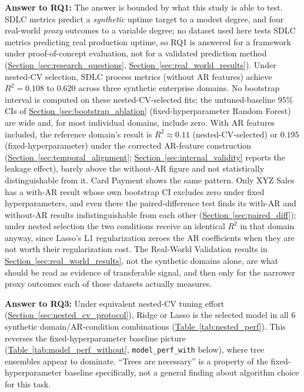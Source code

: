 \documentclass[technologies,article,submit,pdftex,moreauthors]{Definitions/mdpi}
\begin{document}
\textbf{Answer to RQ1:} The answer is bounded by what this study is able to test. SDLC metrics predict a \emph{synthetic} uptime target to a modest degree, and four real-world \emph{proxy} outcomes to a variable degree; no dataset used here tests SDLC metrics predicting real production uptime, so RQ1 is answered for a framework under proof-of-concept evaluation, not for a validated prediction method (\hyperref[sec:research_questions]{Section~\ref*{sec:research_questions}}, \hyperref[sec:real_world_results]{Section~\ref*{sec:real_world_results}}). Under nested-CV selection, SDLC process metrics (without AR features) achieve \(R^2 = 0.108\) to \(0.620\) across three synthetic enterprise domains. No bootstrap interval is computed on these nested-CV-selected fits; the untuned-baseline 95\% CIs of \hyperref[sec:bootstrap_ablation]{Section~\ref*{sec:bootstrap_ablation}} (fixed-hyperparameter Random Forest) are wide and, for most individual domains, include zero. With AR features included, the reference domain's result is \(R^2\approx0.11\) (nested-CV-selected) or \(0.195\) (fixed-hyperparameter) under the corrected AR-feature construction (\hyperref[sec:temporal_alignment]{Section~\ref*{sec:temporal_alignment}}; \hyperref[sec:internal_validity]{Section~\ref*{sec:internal_validity}} reports the leakage effect), barely above the without-AR figure and not statistically distinguishable from it. Card Payment shows the same pattern. Only XYZ Sales has a with-AR result whose own bootstrap CI excludes zero under fixed hyperparameters, and even there the paired-difference test finds its with-AR and without-AR results indistinguishable from each other (\hyperref[sec:paired_diff]{Section~\ref*{sec:paired_diff}}); under nested selection the two conditions receive an identical \(R^2\) in that domain anyway, since Lasso's L1 regularization zeroes the AR coefficients when they are not worth their regularization cost. The Real-World Validation results in \hyperref[sec:real_world_results]{Section~\ref*{sec:real_world_results}}, not the synthetic domains alone, are what should be read as evidence of transferable signal, and then only for the narrower proxy outcomes each of those datasets actually measures.

\textbf{Answer to RQ3:} Under equivalent nested-CV tuning effort (\hyperref[sec:nested_cv_protocol]{Section~\ref*{sec:nested_cv_protocol}}), Ridge or Lasso is the selected model in all 6 synthetic domain/AR-condition combinations (\hyperref[tab:nested_perf]{Table~\ref*{tab:nested_perf}}). This reverses the fixed-hyperparameter baseline picture (\hyperref[tab:model_perf_without]{Table~\ref*{tab:model_perf_without}}, \texttt{model\_perf\_with} below), where tree ensembles appear to dominate. ``Trees are necessary'' is a property of the fixed-hyperparameter baseline specifically, not a general finding about algorithm choice for this task.
\end{document}
